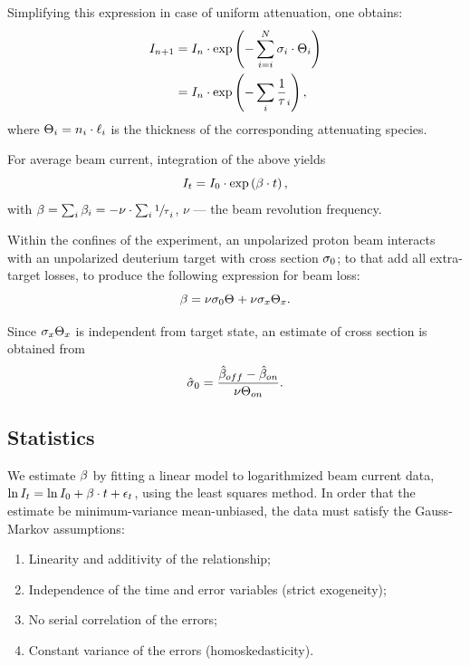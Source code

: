 \documentclass[reprint]{revtex4-1}
\begin{document}
Simplifying this expression in case of uniform attenuation, one obtains:
\begin{align*}
	I_{n+1} &= I_n \cdot \exp\bkt{-\sum_{i=i}^N \CS[i]\cdot \Thick[i]} \\
			&= I_n \cdot \exp\bkt{-\sum_i\frac1\tau_i},
\end{align*}
where $\Thick[i] = n_i\cdot\ell_i$ is the thickness of the corresponding attenuating species.

For average beam current, integration of the above yields
\begin{equation}\label{eq:CurrentDecay}
	I_t = I_0 \cdot \exp\bkt{\slp\cdot t},
\end{equation}
with $\slp = \sum_i \slp[i] = - \nu\cdot\sum_i \sfrac1\tau_i$, $\nu$ --- the beam revolution frequency. 

Within the confines of the experiment, an unpolarized proton beam interacts with an unpolarized deuterium target with cross section $\CS[0]$; to that add all extra-target losses, to produce the following expression for beam loss:
\begin{equation}\label{eq:SlopeModel}
	\slp = \nu\CS[0]\Thick + \nu\CS[x]\Thick[x].
\end{equation}

Since $\CS[x]\Thick[x]$ is independent from target state, an estimate of cross section is obtained from 
\begin{equation}
	\CS*[0] = \frac{\slp*[off] - \slp*[on]}{\nu\Thick[on]}.
\end{equation}

\subsection{Statistics}

We estimate $\slp$ by fitting a linear model to logarithmized beam current data, $\ln I_t = \ln I_0 + \slp\cdot t + \epsilon_t$, using the least squares method. In order that the estimate be minimum-variance mean-unbiased, the data must satisfy the Gauss-Markov assumptions:
\begin{enumerate}
	\item Linearity and additivity of the relationship;
	\item Independence of the time and error variables (strict exogeneity);
	\item No serial correlation of the errors;
	\item Constant variance of the errors (homoskedasticity).
\end{enumerate}
\end{document}
